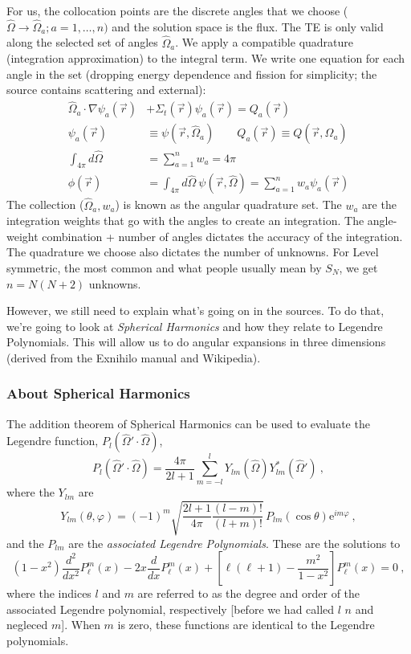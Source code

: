 \documentclass[12pt]{article}
\newcommand{\vecr}{\ensuremath{\vec{r}}}
\newcommand{\omvec}{\ensuremath{\hat{\Omega}}}
\newcommand{\vOmega}{\ensuremath{\hat{\Omega}}}
\begin{document}
For us, the collocation points are the discrete angles that we choose ($\omvec \rightarrow \omvec_a; a = 1,\dots,n)$ and the solution space is the flux. 
The TE is only valid along the selected set of angles $\vOmega_a$. We apply a compatible quadrature (integration approximation) to the integral term. We write one equation for each angle in the set (dropping energy dependence and fission for simplicity; the source contains scattering and external):
\begin{align*}
\vOmega_a \cdot \nabla \psi_a(\vecr) &+ \Sigma_t(\vecr)\psi_a(\vecr) = Q_a(\vec{r})\\
\psi_a(\vecr) &\equiv \psi(\vecr,\vOmega_a) \qquad Q_a(\vecr) \equiv Q(\vecr,\vOmega_a)\\
\int_{4\pi} d\vOmega\: &= \sum_{a=1}^n w_a = 4\pi \\
\phi(\vecr) &=  \int_{4\pi} d\vOmega\:\psi(\vecr,\vOmega) = \sum_{a=1}^n w_a \psi_a(\vecr)
\end{align*}
The collection ($\vOmega_a, w_a$) is known as the angular quadrature set. The $w_a$ are the integration weights that go with the angles to create an integration. The angle-weight combination + number of angles dictates the accuracy of the integration. The quadrature we choose also dictates the number of unknowns. For Level symmetric, the most common and what people usually mean by $S_{N}$, we get $n=N(N+2)$ unknowns. 

However, we still need to explain what's going on in the sources. To do that, we're going to look at \textit{Spherical Harmonics} and how they relate to Legendre Polynomials. This will allow us to do angular expansions in three dimensions (derived from the Exnihilo manual and Wikipedia). 

\subsubsection*{About Spherical Harmonics}
The addition theorem of Spherical Harmonics can be used to evaluate the
Legendre function, $P_l(\vOmega'\cdot\vOmega)$,
\begin{equation}
  P_l(\vOmega'\cdot\vOmega) = \frac{4\pi}{2l+1}\sum_{m=-l}^l
  Y_{lm}(\vOmega)Y^{\ast}_{lm}(\vOmega')\:,
\end{equation}
where the $Y_{lm}$ are
\begin{equation}
  Y_{lm}(\theta,\varphi) = (-1)^m\sqrt
  {
    \frac{2l+1}{4\pi}\frac{(l-m)!}{(l+m)!}
  }\,
  P_{lm}(\cos\theta)\mathrm{e}^{im\varphi}\:,
  \label{eq:complete-spherical-harmonics}
\end{equation}
and the $P_{lm}$ are the \textit{associated Legendre Polynomials}. These are the solutions to
\[
(1-x^{2}){\frac {d^{2}}{dx^{2}}}P_{\ell }^{m}(x)-2x{\frac {d}{dx}}P_{\ell }^{m}(x)+\left[\ell (\ell +1)-{\frac {m^{2}}{1-x^{2}}}\right]P_{\ell }^{m}(x)=0\:,\]
where the indices $l$ and $m$ are referred to as the degree and order of the associated Legendre polynomial, respectively [before we had called $l$ $n$ and negleced $m$]. When $m$ is zero, these functions are identical to the Legendre polynomials.
\end{document}
